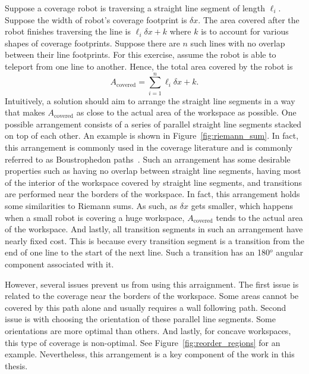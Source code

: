 \documentclass[../main.tex]{subfiles}
\begin{document}
Suppose a coverage robot is traversing a straight line segment of length $\ell_i$. Suppose the width of robot's coverage footprint is $\delta x$. The area covered after the robot finishes traversing the line is $\ell_i\delta x+k$ where $k$ is to account for various shapes of coverage footprints. Suppose there are $n$ such lines with no overlap between their line footprints. For this exercise, assume the robot is able to teleport from one line to another. Hence, the total area covered by the robot is
\begin{equation}
	A_{\text{covered}}=\sum_{i=1}^n\ell_i\delta x + k.
\end{equation}
Intuitively, a solution should aim to arrange the straight line segments in a way that makes $A_{\text{covered}}$ as close to the actual area of the workspace as possible. One possible arrangement consists of a series of parallel straight line segments stacked on top of each other. An example is shown in Figure~\ref{fig:riemann_sum}. In fact, this arrangement is commonly used in the coverage literature and is commonly referred to as Boustrophedon paths~\cite{Choset1998coverage}. Such an arrangement has some desirable properties such as having no overlap between straight line segments, having most of the interior of the workspace covered by straight line segments, and transitions are performed near the borders of the workspace. In fact, this arrangement holds some similarities to Riemann sums. As such, as $\delta x$ gets smaller, which happens when a small robot is covering a huge workspace, $A_{\text{covered}}$ tends to the actual area of the workspace. And lastly, all transition segments in such an arrangement have nearly fixed cost. This is because every transition segment is a transition from the end of one line to the start of the next line. Such a transition has an 180$^o$ angular component associated with it.


However, several issues prevent us from using this arraignment. The first issue is related to the coverage near the borders of the workspace. Some areas cannot be covered by this path alone and usually requires a wall following path. Second issue is with choosing the orientation of these parallel line segments. Some orientations are more optimal than others. And lastly, for concave workspaces, this type of coverage is non-optimal. See Figure~\ref{fig:reorder_regions} for an example. Nevertheless, this arrangement is a key component of the work in this thesis.
\end{document}
